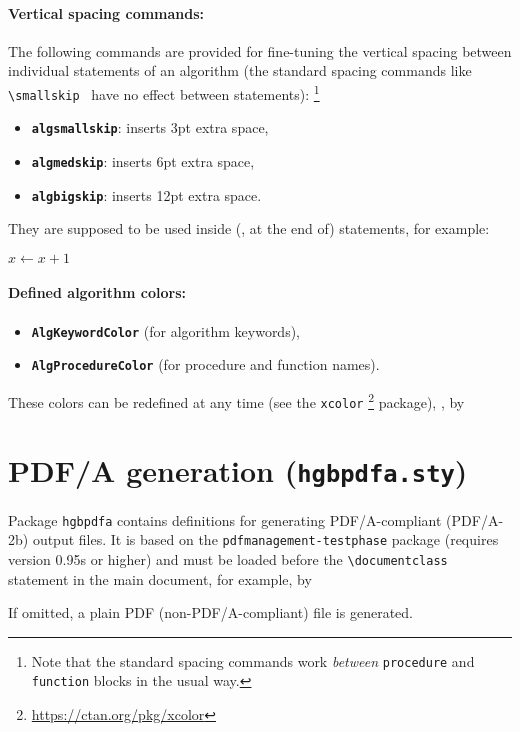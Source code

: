 \documentclass[english]{hgbarticle}
\begin{document}
\paragraph{Vertical spacing commands:}
The following commands are provided for fine-tuning the vertical spacing
between individual statements of an algorithm (the standard spacing commands
like \verb!\smallskip! \etc\ have no effect between statements):%
\footnote{Note that the standard spacing commands work \emph{between}
\texttt{procedure} and \texttt{function} blocks in the usual way.}
\begin{itemize}
    \item \textbf{{\bs}\texttt{algsmallskip}}: inserts 3pt extra space,
    \item \textbf{{\bs}\texttt{algmedskip}}: inserts 6pt extra space,
    \item \textbf{{\bs}\texttt{algbigskip}}: inserts 12pt extra space.
\end{itemize}
They are supposed to be used inside (\ie, at the end of) statements, for
example:
%
\begin{LaTeXCode}[numbers=none]
    \State $x \gets x + 1$ \algsmallskip
\end{LaTeXCode}

\paragraph{Defined algorithm colors:}
\begin{itemize}
    \item \textbf{\texttt{AlgKeywordColor}} (for algorithm keywords),
    \item \textbf{\texttt{AlgProcedureColor}} (for procedure and function
    names).
\end{itemize}
These colors can be redefined at any time (see the \texttt{xcolor}%
\footnote{\url{https://ctan.org/pkg/xcolor}}
package), \eg, by
\begin{LaTeXCode}[numbers=none]
\end{LaTeXCode}


\section{PDF/A generation (\texttt{hgbpdfa.sty})}

Package \texttt{hgbpdfa} contains definitions for generating PDF/A-compliant 
(PDF/A-2b) output files. It is based on the \texttt{pdfmanagement-testphase}
package (requires version 0.95s or higher) and must be loaded before the
\verb!\documentclass! statement in the main document, for example, by
\begin{LaTeXCode}[numbers=none]
\RequirePackage{hgbpdfa}
\end{LaTeXCode}
If omitted, a plain PDF (non-PDF/A-compliant) file is generated.
\end{document}
